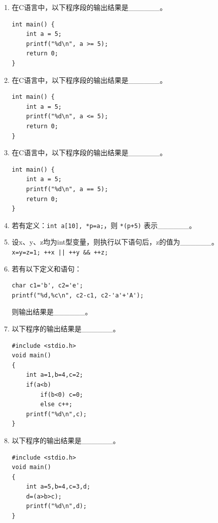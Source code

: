 \documentclass[a4paper,12pt]{article}
\begin{document}
\begin{enumerate}
	\item 在C语言中，以下程序段的输出结果是\_\_\_\_\_\_。
	      \begin{verbatim}
int main() {
    int a = 5;
    printf("%d\n", a >= 5);
    return 0;
}
    \end{verbatim}
	      \vspace{0.3cm}

	\item 在C语言中，以下程序段的输出结果是\_\_\_\_\_\_。
	      \begin{verbatim}
int main() {
    int a = 5;
    printf("%d\n", a <= 5);
    return 0;
}
    \end{verbatim}
	      \vspace{0.3cm}

	\item 在C语言中，以下程序段的输出结果是\_\_\_\_\_\_。
	      \begin{verbatim}
int main() {
    int a = 5;
    printf("%d\n", a == 5);
    return 0;
}
    \end{verbatim}
	      \vspace{0.3cm}

	\item 若有定义：\texttt{int a[10], *p=a;}，则 \texttt{*(p+5)} 表示\_\_\_\_\_\_。
	      \vspace{0.3cm}

	\item 设x、y、z均为int型变量，则执行以下语句后，z的值为\_\_\_\_\_\_。\\
	      \texttt{x=y=z=1; ++x || ++y \&\& ++z;}
	      \vspace{0.3cm}

	\item 若有以下定义和语句：
	      \begin{verbatim}
char c1='b', c2='e';
printf("%d,%c\n", c2-c1, c2-'a'+'A');
      \end{verbatim}
	      则输出结果是\_\_\_\_\_\_。
	      \vspace{0.3cm}

	\item 以下程序的输出结果是\_\_\_\_\_\_。
	      \begin{verbatim}
#include <stdio.h>
void main()
{
    int a=1,b=4,c=2;
    if(a<b)
        if(b<0) c=0;
        else c++;
    printf("%d\n",c);
}
    \end{verbatim}
	      \vspace{0.3cm}

	\item 以下程序的输出结果是\_\_\_\_\_\_。
	      \begin{verbatim}
#include <stdio.h>
void main()
{
    int a=5,b=4,c=3,d;
    d=(a>b>c);
    printf("%d\n",d);
}
    \end{verbatim}
	      \vspace{0.3cm}


\end{enumerate}
\end{document}
